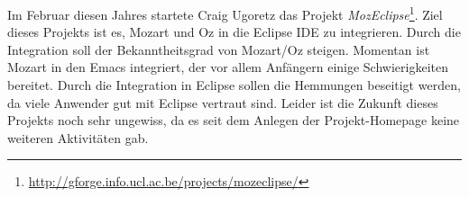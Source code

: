 Im Februar diesen Jahres startete Craig Ugoretz das Projekt 
\textsl{MozEclipse}\footnote{\url{http://gforge.info.ucl.ac.be/projects/mozeclipse/}}. 
Ziel dieses Projekts ist es, Mozart und Oz in die Eclipse IDE zu integrieren. 
Durch die Integration soll der Bekanntheitsgrad von Mozart/Oz steigen. Momentan 
ist Mozart in den Emacs integriert, der vor allem Anfängern einige 
Schwierigkeiten bereitet. Durch die Integration in Eclipse sollen die Hemmungen 
beseitigt werden, da viele Anwender gut mit Eclipse vertraut sind. Leider ist 
die Zukunft dieses Projekts noch sehr ungewiss, da es seit dem Anlegen der 
Projekt-Homepage keine weiteren Aktivitäten gab.